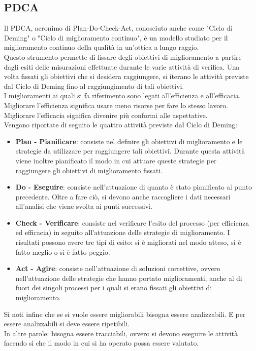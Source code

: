 \documentclass[../PianoDiQualifica.tex]{subfiles}
\begin{document}
\begin{appendices}

\section{PDCA}
	Il PDCA, acronimo di Plan-Do-Check-Act, conosciuto anche come "Ciclo di Deming" o "Ciclo di miglioramento continuo", è un modello studiato per il miglioramento continuo della qualità in un'ottica a lungo raggio.\\
	Questo strumento permette di fissare degli obiettivi di miglioramento a partire dagli esiti delle misurazioni effettuate durante le varie attività di verifica. Una volta fissati gli obiettivi che si desidera raggiungere, si iterano le attività previste dal Ciclo di Deming fino al raggiungimento di tali obiettivi.\\
	I miglioramenti ai quali si fa riferimento sono legati all'efficienza e all'efficacia. Migliorare l'efficienza significa usare meno risorse per fare lo stesso lavoro. Migliorare l'efficacia significa divenire più conformi alle aspettative.\\
	Vengono riportate di seguito le quattro attività previste dal Ciclo di Deming:
	\begin{itemize}
		\item \textbf{Plan - Pianificare}: consiste nel definire gli obiettivi di miglioramento e le strategie da utilizzare per raggiungere tali obiettivi. Durante questa attività viene inoltre pianificato il modo in cui attuare queste strategie per raggiungere gli obiettivi di miglioramento fissati.
		\item \textbf{Do - Eseguire}: consiste nell'attuazione di quanto è stato pianificato al punto precedente. Oltre a fare ciò, si devono anche raccogliere i dati necessari all’analisi che viene svolta ai punti successivi.
		\item \textbf{Check - Verificare}: consiste nel verificare l'esito del processo (per efficienza ed efficacia) in seguito all'attuazione delle strategie di miglioramento. I risultati possono avere tre tipi di esito: si è migliorati nel modo atteso, si è fatto meglio o si è fatto peggio.
		\item \textbf{Act - Agire}: consiste nell'attuazione di soluzioni correttive, ovvero nell'attuazione delle strategie che hanno portato miglioramenti, anche al di fuori dei singoli processi per i quali si erano fissati gli obiettivi di miglioramento.
	\end{itemize}
	Si noti infine che se si vuole essere migliorabili bisogna essere analizzabili. E per essere analizzabili si deve essere ripetibili.\\
	In altre parole: bisogna essere tracciabili, ovvero si devono eseguire le attività facendo sì che il modo in cui si ha operato possa essere valutato.
	
\end{appendices}
\end{document}
